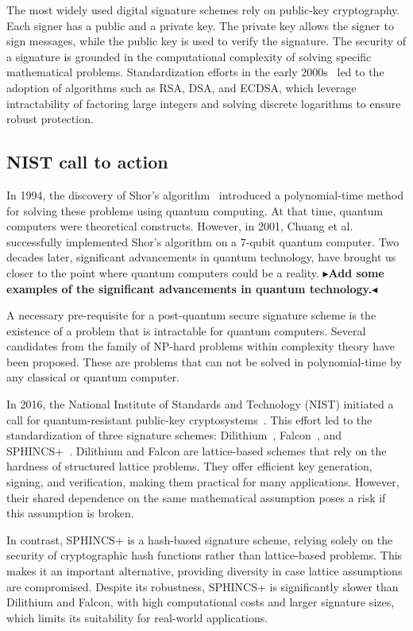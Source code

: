 \documentclass[11pt]{report}
\theoremstyle{definition}
\theoremstyle{plain}
\newcommand{\todo}[1]{{\color[rgb]{.5,0,0}\textbf{$\blacktriangleright$#1$\blacktriangleleft$}}}
\begin{document}
The most widely used digital signature schemes rely on public-key cryptography. Each signer has a public and a private key. The private key allows the signer to sign messages, while the public key is used to verify the signature. The security of a signature is grounded in the computational complexity of solving specific mathematical problems. Standardization efforts in the early 2000s~\cite{pub2000digital} led to the adoption of algorithms such as RSA, DSA, and ECDSA, which leverage intractability of factoring large integers and solving discrete logarithms to ensure robust protection.

\subsection{NIST call to action}

In 1994, the discovery of Shor's algorithm~\cite{shor1997} introduced a polynomial-time method for solving these problems using quantum computing. At that time, quantum computers were theoretical constructs. However, in 2001, Chuang et al.~\cite{vandersypen2001experimental,buchmann2004post} successfully implemented Shor's algorithm on a 7-qubit quantum computer. Two decades later, significant advancements in quantum technology, have brought us closer to the point where quantum computers could be a reality.
\todo{Add some examples of the significant advancements in quantum technology.}

A necessary pre-requisite for a post-quantum secure signature scheme is the existence of a problem that is intractable for quantum computers. Several candidates from the family of NP-hard problems within complexity theory have been proposed. These are problems that can not be solved in polynomial-time by any classical or quantum computer.

In 2016, the National Institute of Standards and Technology (NIST) initiated a call for quantum-resistant public-key cryptosystems~\cite{nistcall}. This effort led to the standardization of three signature schemes: Dilithium~\cite{ducas2018crystals}, Falcon~\cite{fouque2018falcon}, and SPHINCS+~\cite{bernstein2019sphincs+}. Dilithium and Falcon are lattice-based schemes that rely on the hardness of structured lattice problems. They offer efficient key generation, signing, and verification, making them practical for many applications. However, their shared dependence on the same mathematical assumption poses a risk if this assumption is broken.

In contrast, SPHINCS+ is a hash-based signature scheme, relying solely on the security of cryptographic hash functions rather than lattice-based problems. This makes it an important alternative, providing diversity in case lattice assumptions are compromised. Despite its robustness, SPHINCS+ is significantly slower than Dilithium and Falcon, with high computational costs and larger signature sizes, which limits its suitability for real-world applications.
\end{document}
